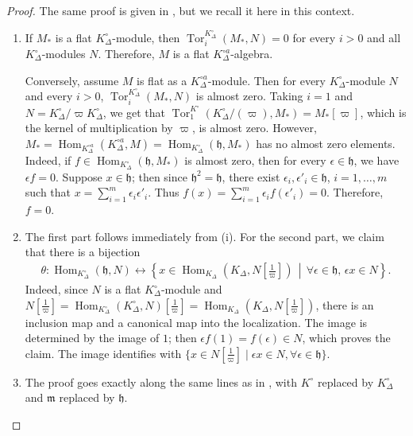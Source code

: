 \documentclass[12pts,a4paper]{amsart}
\DeclareMathOperator{\Hom}{Hom}
\DeclareMathOperator{\Tor}{Tor}
\begin{document}
\begin{proof}
The same proof is given in \cite{Sch}, but we recall it here in this context.
\begin{enumerate}
    \item[(i)] If $M_*$ is a flat $K^\circ_\Delta$-module, then $\Tor^{K^\circ_\Delta}_i(M_*,N)=0$ for every $i>0$ and all $K^\circ_\Delta$-modules $N$. Therefore, $M$ is a flat $K^{\circ a}_\Delta$-algebra.

    Conversely, assume $M$ is flat as a $K^{\circ a}_\Delta$-module. Then for every $K^\circ_\Delta$-module $N$ and every $i > 0$, $\Tor^{K^\circ_\Delta}_i(M_*, N)$ is almost zero. Taking $i=1$ and $N = K^\circ_\Delta/\varpi K^\circ_\Delta$, we get that $\Tor^{K^\circ}_1(K^\circ_\Delta/(\varpi),M_*)=M_*[\varpi]$, which is the kernel of multiplication by $\varpi$, is almost zero. However, $M_* = \Hom_{K^{\circ a}_\Delta}(K^{\circ a}_\Delta, M) = \Hom_{K^\circ_\Delta}(\mathfrak{h}, M_*)$ has no almost zero elements. Indeed, if $f\in\Hom_{K^\circ_\Delta}(\mathfrak{h},M_*)$ is almost zero, then for every $\epsilon\in\mathfrak{h}$, we have $\epsilon f=0$. Suppose $x\in\mathfrak{h}$; then since $\mathfrak{h}^2=\mathfrak{h}$, there exist $\epsilon_i,\epsilon'_i\in\mathfrak{h}$, $i=1,\dots,m$ such that $x=\sum\limits_{i=1}^m\epsilon_i\epsilon'_i$. Thus $f(x)=\sum\limits_{i=1}^m\epsilon_if(\epsilon'_i)=0$. Therefore, $f=0$.

    \item[(ii)] The first part follows immediately from (i). For the second part, we claim that there is a bijection
    \begin{align*}
        \theta: \Hom_{K^\circ_\Delta}(\mathfrak{h}, N) \leftrightarrow \left\{ x \in \Hom_{K_\Delta}\left(K_\Delta, N\left[\frac{1}{\varpi}\right]\right) \,\middle|\, \forall \epsilon \in \mathfrak{h}, \, \epsilon x \in N \right\}.
    \end{align*}
    Indeed, since $N$ is a flat $K^\circ_\Delta$-module and  $N\left[\frac{1}{\varpi}\right]=\Hom_{K^\circ_\Delta}\left(K^\circ_\Delta,N\right)\left[\frac{1}{\varpi}\right]=\Hom_{K_\Delta}\left(K_\Delta,N\left[\frac{1}{\varpi}\right]\right)$, there is an inclusion map and a canonical map into the localization. The image is determined by the image of $1$; then $\epsilon f(1)=f(\epsilon)\in N$, which proves the claim. The image identifies with $\Big\{x\in N\left[\frac{1}{\varpi}\right]\mid \epsilon x\in N, \forall \epsilon\in\mathfrak{h}\Big\}$.

    \item[(iii)] The proof goes exactly along the same lines as in \cite{Sch}, with $K^{\circ}$ replaced by $K^\circ_\Delta$ and $\mathfrak{m}$ replaced by $\mathfrak{h}$.


\end{enumerate}
\end{proof}
\end{document}
